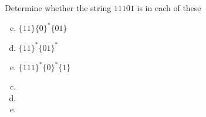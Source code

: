 \documentclass[../main.tex]{subfiles}
\begin{document}
Determine whether the string $11101$ is in each of these
\begin{enumerate}[a)]
	\setcounter{enumi}{2}
	\item $\{11\}\{0\}^\ast\{01\}$
	\setcounter{enumi}{3}
	\item $\{11\}^\ast\{01\}^\ast$
	\setcounter{enumi}{4}
	\item $\{111\}^\ast\{0\}^\ast\{1\}$
\end{enumerate}

\solution
\begin{enumerate}[a)]
	\setcounter{enumi}{2}
	\item 
	\setcounter{enumi}{3}
	\item 
	\setcounter{enumi}{4}
	\item 
\end{enumerate}
\end{document}
